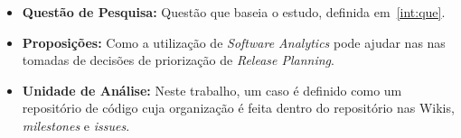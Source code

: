 \begin{itemize}
    \item \textbf{Questão de Pesquisa:} Questão que baseia o estudo, definida em~\ref{int:que}.
    \item \textbf{Proposições:} Como a utilização de \textit{Software Analytics} pode ajudar nas
    nas tomadas de decisões de priorização de \textit{Release Planning}.
    \item \textbf{Unidade de Análise:} Neste trabalho, um caso é definido como um repositório
        de código cuja organização é feita dentro do repositório nas Wikis, \textit{milestones}
        e \textit{issues}.
\end{itemize}

